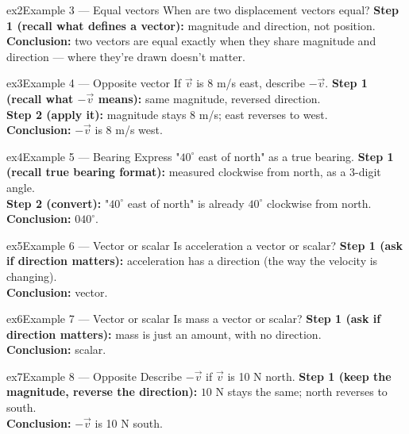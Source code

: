 \documentclass[11pt]{article}
\begin{document}
\begin{example}{ex2}{Example 3 --- Equal vectors}
When are two displacement vectors equal?\soln
\textbf{Step 1 (recall what defines a vector):} magnitude and direction, not position.\\[3pt]
\textbf{Conclusion:} two vectors are equal exactly when they share magnitude and direction --- where they're drawn doesn't matter.
\end{example}

\begin{example}{ex3}{Example 4 --- Opposite vector}
If $\vec v$ is 8 m/s east, describe $-\vec v$.\soln
\textbf{Step 1 (recall what $-\vec v$ means):} same magnitude, reversed direction.\\[3pt]
\textbf{Step 2 (apply it):} magnitude stays $8$ m/s; east reverses to west.\\[3pt]
\textbf{Conclusion:} $-\vec v$ is 8 m/s west.
\end{example}

\begin{example}{ex4}{Example 5 --- Bearing}
Express "$40^\circ$ east of north" as a true bearing.\soln
\textbf{Step 1 (recall true bearing format):} measured clockwise from north, as a 3-digit angle.\\[3pt]
\textbf{Step 2 (convert):} "$40^\circ$ east of north" is already $40^\circ$ clockwise from north.\\[3pt]
\textbf{Conclusion:} $040^\circ$.
\end{example}

\begin{example}{ex5}{Example 6 --- Vector or scalar}
Is acceleration a vector or scalar?\soln
\textbf{Step 1 (ask if direction matters):} acceleration has a direction (the way the velocity is changing).\\[3pt]
\textbf{Conclusion:} vector.
\end{example}

\begin{example}{ex6}{Example 7 --- Vector or scalar}
Is mass a vector or scalar?\soln
\textbf{Step 1 (ask if direction matters):} mass is just an amount, with no direction.\\[3pt]
\textbf{Conclusion:} scalar.
\end{example}

\begin{example}{ex7}{Example 8 --- Opposite}
Describe $-\vec v$ if $\vec v$ is 10 N north.\soln
\textbf{Step 1 (keep the magnitude, reverse the direction):} $10$ N stays the same; north reverses to south.\\[3pt]
\textbf{Conclusion:} $-\vec v$ is 10 N south.
\end{example}
\end{document}
